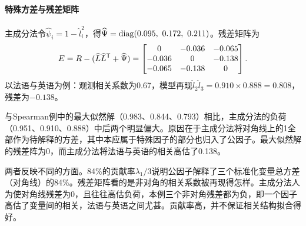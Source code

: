 \paragraph{特殊方差与残差矩阵}
主成分法令$\widehat\psi_i=1-\widehat l_i^{2}$，得$\widehat\Psi=\diag(0.095,\ 0.172,\ 0.211)$。残差矩阵为
\[
E=R-(\widehat L\widehat L^{\mathsf T}+\widehat\Psi)=
\begin{bmatrix}0&-0.036&-0.065\\-0.036&0&-0.138\\-0.065&-0.138&0\end{bmatrix}.
\]
以法语与英语为例：观测相关系数为0.67，模型再现$\widehat l_2\widehat l_3=0.910\times0.888=0.808$，残差为$-0.138$。

与Spearman例中的最大似然解（0.983、0.844、0.793）相比，主成分法的负荷（0.951、0.910、0.888）中后两个明显偏大。原因在于主成分法将对角线上的1全部作为待解释的方差，其中本应属于特殊因子的部分也归入了公因子。最大似然解的残差阵为0，而主成分法将法语与英语的相关高估了0.138。

两者反映不同的方面。84\%的贡献率$\lambda_1/3$说明公因子解释了三个标准化变量总方差（对角线）的84\%。残差矩阵看的是非对角的相关系数被再现得怎样。主成分法人为使对角线残差为0，且往往高估负荷，本例三个非对角残差都为负，即一个因子高估了变量间的相关，法语与英语之间尤甚。贡献率高，并不保证相关结构拟合得好。
